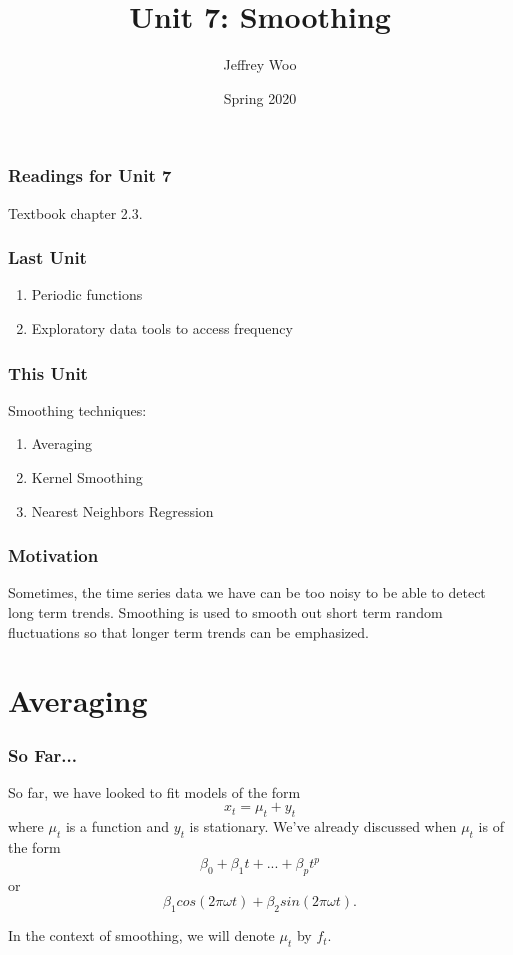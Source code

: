 \documentclass[%
xcolor=pdftex]{beamer}
\title{Unit 7: Smoothing}
\author[STAT 5170: Applied Time Series, Unit 7]{Jeffrey Woo}
\institute{Department of Statistics, University of Virginia}
\date{Spring 2020}
\begin{document}
\frame{\titlepage}


\begin{frame}
\frametitle{Readings for Unit 7}

Textbook chapter 2.3.

\end{frame}


\begin{frame}
\frametitle{Last Unit}
\begin{enumerate}
\item Periodic functions
\item Exploratory data tools to access frequency
\end{enumerate}
\end{frame}

\begin{frame}
\frametitle{This Unit}
Smoothing techniques:
\begin{enumerate}
\item Averaging
\item Kernel Smoothing
\item Nearest Neighbors Regression
\end{enumerate}
\end{frame}

\begin{frame}
\frametitle{Motivation}

Sometimes, the time series data we have can be too noisy to be able to detect long term trends. Smoothing is used to smooth out short term random fluctuations so that longer term trends can be emphasized.

\end{frame}

\section{Averaging}
\frame{\tableofcontents[currentsection]}

\begin{frame}
\frametitle{So Far...}

So far, we have looked to fit models of the form
$$
x_t=\mu_t +y_t
$$
where $\mu_t$ is a function and $y_t$ is stationary.  We've already discussed when $\mu_t$ is of the form
$$
\beta_0+\beta_1 t+...+\beta_{p} t^p
$$
or
$$
\beta_1 cos(2 \pi \omega  t)+\beta_2 sin(2 \pi \omega  t).
$$

In the context of smoothing, we will denote $\mu_t$ by $f_t$.

\end{frame}
\end{document}
